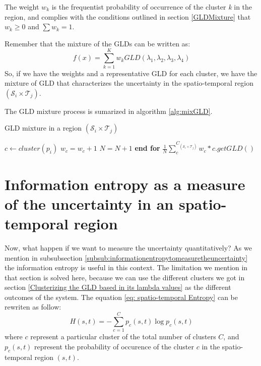 The weight $w_k$ is the frequentist probability of occurrence of the cluster \textit{k} in the region, and complies with the conditions outlined in section \ref{GLDMixture} that $w_{k} \geq 0$ and $\sum w_{k}=1$.

Remember that the mixture of the GLDs can be written as:
\begin{equation}
f(x)=\sum_{k=1}^K w_{k}GLD(\lambda_{1},\lambda_{2},\lambda_{3},\lambda_{4})
\end{equation}
So, if we have the weights and a representative GLD for each cluster, we have the mixture of GLD that characterizes the uncertainty in the spatio-temporal region $(\mathcal{S}_{i} \times \mathcal{T}_{j})$.

The GLD mixture process is sumarized in algorithm \ref{alg:mixGLD}.

\begin{algorithm} 
\caption{GLD mixture in a region $(\mathcal{S}_{i} \times \mathcal{T}_{j})$}\label{alg:mixGLD}
\begin{algorithmic}[1] 
\State $c \gets cluster(p_i)$
\State $w_c= w_c+1$
\State $N=N+1$
\EndFor
\State \textbf{end for}
\State \Return $\frac{1}{N} \sum_{c}^{C_{(\mathcal{S}_{i} \times \mathcal{T}_{j})}} 
    w_{c} * c.getGLD()$
\EndFunction 
\end{algorithmic} 
\end{algorithm} 

\section{Information entropy as a measure of the uncertainty in an spatio-temporal region}
\label{sub:InfomationEntropyRegionWorkflow}
Now, what happen if we want to measure the uncertainty quantitatively? As we mention in subsubsection \ref{subsub:informationentropytomeasuretheuncertainty} the information entropy is useful in this context. The limitation we mention in that section is solved here, because we can use the different clusters we got in section \ref{Clusterizing the GLD based in its lambda values} as the different outcomes of the system. 
The equation \ref{eq: spatio-temporal Entropy} can be rewriten as follow:
\begin{equation}\label{eq: spatio-temporal EntropyWorkflow}
H(s,t)=-\sum_{c=1}^C p_{c}(s,t)\log p_{c}(s,t)
\end{equation}
where $c$ represent a particular cluster of the total number of clusters $C$, and $p_{c}(s,t)$ represent the probability of occurence of the cluster $c$ in the spatio-temporal region $(s,t)$.

